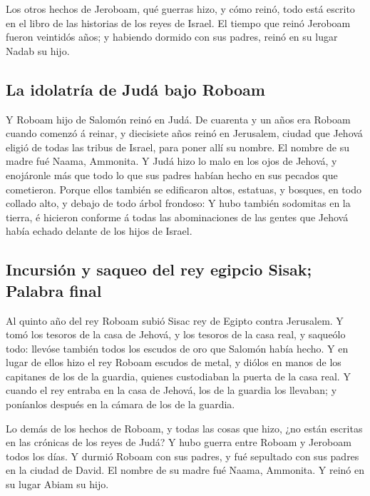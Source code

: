  Los otros hechos de Jeroboam, qué guerras hizo, y cómo
reinó, todo está escrito en el libro de las historias de los reyes de
Israel.  El tiempo que reinó Jeroboam fueron veintidós
años; y habiendo dormido con sus padres, reinó en su lugar Nadab su
hijo.

\hypertarget{la-idolatruxeda-de-juduxe1-bajo-roboam}{%
\subsection{La idolatría de Judá bajo
Roboam}\label{la-idolatruxeda-de-juduxe1-bajo-roboam}}

 Y Roboam hijo de Salomón reinó en Judá. De cuarenta y un
años era Roboam cuando comenzó á reinar, y diecisiete años reinó en
Jerusalem, ciudad que Jehová eligió de todas las tribus de Israel, para
poner allí su nombre. El nombre de su madre fué Naama, Ammonita.
 Y Judá hizo lo malo en los ojos de Jehová, y enojáronle
más que todo lo que sus padres habían hecho en sus pecados que
cometieron.  Porque ellos también se edificaron altos,
estatuas, y bosques, en todo collado alto, y debajo de todo árbol
frondoso:  Y hubo también sodomitas en la tierra, é
hicieron conforme á todas las abominaciones de las gentes que Jehová
había echado delante de los hijos de Israel.

\hypertarget{incursiuxf3n-y-saqueo-del-rey-egipcio-sisak-palabra-final}{%
\subsection{Incursión y saqueo del rey egipcio Sisak; Palabra
final}\label{incursiuxf3n-y-saqueo-del-rey-egipcio-sisak-palabra-final}}

 Al quinto año del rey Roboam subió Sisac rey de Egipto
contra Jerusalem.  Y tomó los tesoros de la casa de
Jehová, y los tesoros de la casa real, y saqueólo todo: llevóse también
todos los escudos de oro que Salomón había hecho.  Y en
lugar de ellos hizo el rey Roboam escudos de metal, y diólos en manos de
los capitanes de los de la guardia, quienes custodiaban la puerta de la
casa real.  Y cuando el rey entraba en la casa de Jehová,
los de la guardia los llevaban; y poníanlos después en la cámara de los
de la guardia.

 Lo demás de los hechos de Roboam, y todas las cosas que
hizo, ¿no están escritas en las crónicas de los reyes de Judá?
 Y hubo guerra entre Roboam y Jeroboam todos los días.
 Y durmió Roboam con sus padres, y fué sepultado con sus
padres en la ciudad de David. El nombre de su madre fué Naama, Ammonita.
Y reinó en su lugar Abiam su hijo.

